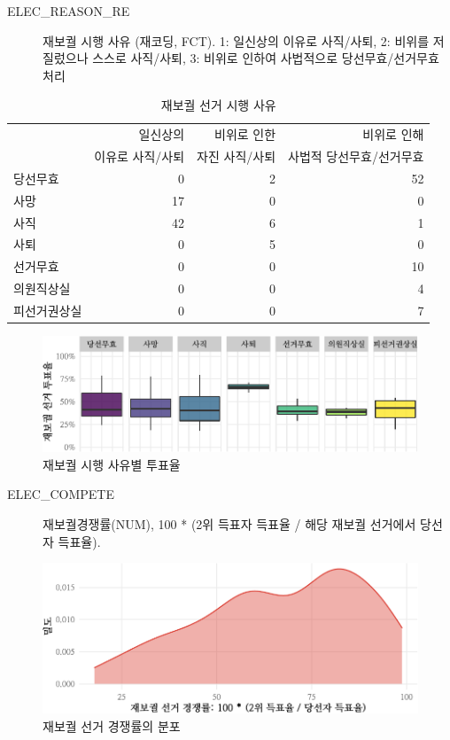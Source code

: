 \documentclass[
  11pt,
  letter]{article}
\begin{document}
\begin{description}
\item[ELEC\_REASON\_RE]
재보궐 시행 사유 (재코딩, FCT). 1: 일신상의 이유로 사직/사퇴, 2: 비위를
저질렀으나 스스로 사직/사퇴, 3: 비위로 인하여 사법적으로
당선무효/선거무효 처리
\end{description}

\begin{table}[H]

\caption{재보궐 선거 시행 사유}
\centering
\begin{tabular}[t]{l|r|r|r}
\hline
  & 일신상의  & 비위로 인한 & 비위로 인해\\
  & 이유로 사직/사퇴 & 자진 사직/사퇴 & 사법적 당선무효/선거무효\\
\hline
당선무효 & 0 & 2 & 52\\
\hline
사망 & 17 & 0 & 0\\
\hline
사직 & 42 & 6 & 1\\
\hline
사퇴 & 0 & 5 & 0\\
\hline
선거무효 & 0 & 0 & 10\\
\hline
의원직상실 & 0 & 0 & 4\\
\hline
피선거권상실 & 0 & 0 & 7\\
\hline
\end{tabular}
\end{table}

\begin{figure}
\centering
\includegraphics{Codebook_national_files/figure-latex/unnamed-chunk-5-1.pdf}
\caption{재보궐 시행 사유별 투표율}
\end{figure}

\begin{description}
\item[ELEC\_COMPETE]
재보궐경쟁률(NUM), 100 * (2위 득표자 득표율 / 해당 재보궐 선거에서
당선자 득표율).
\end{description}

\begin{figure}
\centering
\includegraphics{Codebook_national_files/figure-latex/unnamed-chunk-6-1.pdf}
\caption{재보궐 선거 경쟁률의 분포}
\end{figure}
\end{document}
